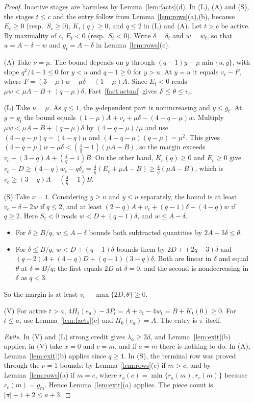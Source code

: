 \documentclass[11pt,a4paper]{article}
\numberwithin{equation}{section}
\theoremstyle{definition}
\begin{document}
\begin{proof}
Inactive stages are harmless by Lemma~\ref{lem:facts}(d). In (L), (A) and (S),
the stages $t\le c$ and the entry follow from Lemma~\ref{lem:rows}(a),(b),
because $E_c\ge0$ (resp.\ $S_c\ge0$), $K_t(q)\ge0$, and $q\le2$ in (L) and (A).
Let $t>c$ be active. By maximality of $c$, $E_t<0$ (resp.\ $S_t<0$). Write
$\delta=\delta_t$ and $w=w_t$, so that $u=A-\delta-w$ and $g_t=A-\delta$ in
Lemma~\ref{lem:rows}(c).

(A) Take $\nu=\mu$. The bound depends on $y$ through
$(q-1)y-\mu\min\{u,y\}$, with slope $q^2/4-1\le0$ for $y<u$ and $q-1\ge0$ for
$y>u$. At $y=u$ it equals $v_c-F$, where $F=(3-\mu)w-\mu\delta-(1-\mu)A$.
Since $E_t<0$ reads $\mu w<\mu A-B+(q-\mu)\delta$, Fact~\ref{fact:actual}
gives $F\le\theta\le v_c$.

(L) Take $\nu=\mu$. As $q\le1$, the $y$-dependent part is nonincreasing and
$y\le g_t$. At $y=g_t$ the bound equals $(1-\mu)A+v_c+\mu\delta-(4-q-\mu)w$.
Multiply $\mu w<\mu A-B+(q-\mu)\delta$ by $(4-q-\mu)/\mu$ and use
$(4-q-\mu)q=(4-q)\mu$ and $(4-q-\mu)(q-\mu)=\mu^2$. This gives
$(4-q-\mu)w-\mu\delta<(\frac4q-1)(\mu A-B)$, so the margin exceeds
$v_c-(3-q)A+(\frac4q-1)B$. On the other hand, $K_c(q)\ge0$ and $E_c\ge0$ give
$v_c+D\ge(4-q)w_c-q\delta_c=\frac4q(E_c+\mu A-B)\ge\frac4q(\mu A-B)$, which is
$v_c\ge(3-q)A-(\frac4q-1)B$.

(S) Take $\nu=1$. Considering $y\ge u$ and $y\le u$ separately, the bound is at
least $v_c+\delta-2w$ if $q\le2$, and at least $(2-q)A+v_c+(q-1)\delta-(4-q)w$
if $q\ge2$. Here $S_t<0$ reads $w<D+(q-1)\delta$, and $w\le A-\delta$.
\begin{itemize}
\item For $\delta\ge B/q$, $w\le A-\delta$ bounds both subtracted quantities by
$2A-3\delta\le\theta$.
\item For $\delta\le B/q$, $w<D+(q-1)\delta$ bounds them by
$2D+(2q-3)\delta$ and $(q-2)A+(4-q)D+(q-1)(3-q)\delta$. Both are linear in
$\delta$ and equal $\theta$ at $\delta=B/q$; the first equals $2D$ at
$\delta=0$, and the second is nondecreasing in $\delta$ as $q<3$.
\end{itemize}
So the margin is at least $v_c-\max\{2D,\theta\}\ge0$.

(V) For active $t>a$, $4H_t(e_a)-3P_t=A+v_t-4w_t=B+K_t(0)\ge0$. For $t\le a$,
use Lemma~\ref{lem:facts}(e) and $H_0(e_a)=A$. The entry is $\pi$ itself.

\emph{Exits.} In (V) and (L) strong credit gives $\lambda_a\ge2d$, and
Lemma~\ref{lem:exit}(b) applies; in (V) take $x=0$ and $c=m$, and if $a=m$ there
is nothing to do. In (A), Lemma~\ref{lem:exit}(b) applies since $q\ge1$. In
(S), the terminal row was proved through the $\nu=1$ bounds: by
Lemma~\ref{lem:rows}(c) if $m>c$, and by Lemma~\ref{lem:rows}(a) if $m=c$, where
$r_a(c)=\min\{r_a(m),r_c(m)\}$ because $r_c(m)=g_m$. Hence
Lemma~\ref{lem:exit}(a) applies. The piece count is
$|\pi|+1+2\le a+3$.
\end{proof}
\end{document}
